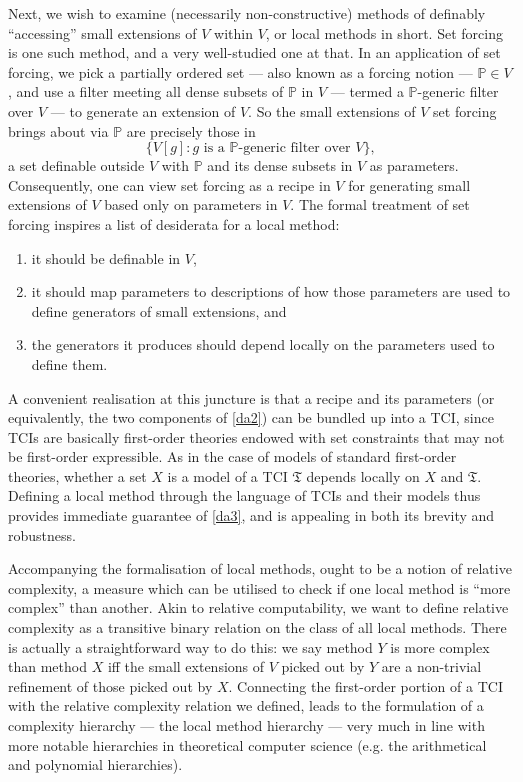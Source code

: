 \documentclass[12pt, twoside]{memoir}
\numberwithin{equation}{section}
\theoremstyle{definition}
\theoremstyle{remark}
\theoremstyle{definition}
\theoremstyle{definition}
\theoremstyle{definition}
\theoremstyle{remark}
\begin{document}
Next, we wish to examine (necessarily non-constructive) methods of definably ``accessing'' small extensions of $V$ within $V$, or local methods in short. Set forcing is one such method, and a very well-studied one at that. In an application of set forcing, we pick a partially ordered set --- also known as a forcing notion --- $\mathbb{P} \in V$, and use a filter meeting all dense subsets of $\mathbb{P}$ in $V$ --- termed a $\mathbb{P}$-generic filter over $V$ --- to generate an extension of $V$. So the small extensions of $V$ set forcing brings about via $\mathbb{P}$ are precisely those in
\begin{equation*}
    \{V[g] : g \text{ is a } \mathbb{P} \text{-generic filter over } V\} \text{,}
\end{equation*}
a set definable outside $V$ with $\mathbb{P}$ and its dense subsets in $V$ as parameters. Consequently, one can view set forcing as a recipe in $V$ for generating small extensions of $V$ based only on parameters in $V$. The formal treatment of set forcing inspires a list of desiderata for a local method:
\begin{enumerate}[leftmargin=40pt, label=(DA\arabic*)]
    \item\label{da1} it should be definable in $V$,
    \item\label{da2} it should map parameters to descriptions of how those parameters are used to define generators of small extensions, and
    \item\label{da3} the generators it produces should depend locally on the parameters used to define them. 
\end{enumerate}

A convenient realisation at this juncture is that a recipe and its parameters (or equivalently, the two components of \ref{da2}) can be bundled up into a TCI, since TCIs are basically first-order theories endowed with set constraints that may not be first-order expressible. As in the case of models of standard first-order theories, whether a set $X$ is a model of a TCI $\mathfrak{T}$ depends locally on $X$ and $\mathfrak{T}$. Defining a local method through the language of TCIs and their models thus provides immediate guarantee of \ref{da3}, and is appealing in both its brevity and robustness.

Accompanying the formalisation of local methods, ought to be a notion of relative complexity, a measure which can be utilised to check if one local method is ``more complex'' than another. Akin to relative computability, we want to define relative complexity as a transitive binary relation on the class of all local methods. There is actually a straightforward way to do this: we say method $Y$ is more complex than method $X$ iff the small extensions of $V$ picked out by $Y$ are a non-trivial refinement of those picked out by $X$. Connecting the first-order portion of a TCI with the relative complexity relation we defined, leads to the formulation of a complexity hierarchy --- the local method hierarchy --- very much in line with more notable hierarchies in theoretical computer science (e.g. the arithmetical and polynomial hierarchies).
\end{document}

